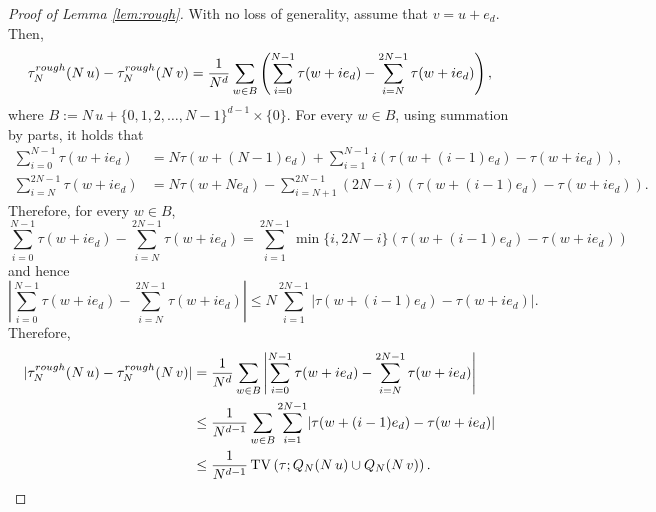 \documentclass[11pt, reqno]{amsart}
\DeclareMathOperator{\TV}{TV}
\numberwithin{equation}{section}
\begin{document}
\begin{proof}[Proof of Lemma \ref{lem:rough}]
With no loss of generality, assume that $v=u+e_d$. 
Then,
$$
\tau^{\rm rough}_N(N\,u)-\tau^{\rm rough}_N(N\,v)=\frac{1}{N^d}\sum_{w\in B}\left(\sum_{i=0}^{N-1}\tau(w+ie_d)-\sum_{i=N}^{2N-1}\tau(w+ie_d)\right),
$$
where $B:=N\,u+\{0,1,2,\ldots,N-1\}^{d-1}\times\{0\}$.
For every $w\in B$, using summation by parts, it holds that
\begin{align*}
\sum_{i=0}^{N-1} \tau(w+ie_d)&=N\tau(w+(N-1)e_d)+\sum_{i=1}^{N-1}i\left(\tau(w+(i-1)e_d)-\tau(w+ie_d)\right),\\
\sum_{i=N}^{2N-1}\tau(w+ie_d)&=N\tau(w+Ne_d)-\sum_{i=N+1}^{2N-1}(2N-i)\left(\tau(w+(i-1)e_d)-\tau(w+ie_d)\right).
\end{align*}
Therefore, for every $w\in B$,
\begin{equation*}
\sum_{i=0}^{N-1} \tau(w+ie_d)-\sum_{i=N}^{2N-1}\tau(w+ie_d)=\sum_{i=1}^{2N-1}\min\{i,2N-i\}\left(\tau(w+(i-1)e_d)-\tau(w+ie_d)\right)
\end{equation*}
and hence
\begin{equation*}
\left\lvert\sum_{i=0}^{N-1} \tau(w+ie_d)-\sum_{i=N}^{2N-1}\tau(w+ie_d)\right\rvert\leq N\sum_{i=1}^{2N-1}\lvert\tau(w+(i-1)e_d)-\tau(w+ie_d)\rvert.
\end{equation*}
Therefore,
\begin{align*}
\lvert\tau^{\rm rough}_N(N\,u)-\tau^{\rm rough}_N(N\,v)\rvert&=\frac{1}{N^d}\sum_{w\in B}\left\lvert\sum_{i=0}^{N-1}\tau(w+ie_d)-\sum_{i=N}^{2N-1}\tau(w+ie_d)\right\rvert\\
&\leq\frac{1}{N^{d-1}}\sum_{w\in B}\sum_{i=1}^{2N-1}\lvert\tau(w+(i-1)e_d)-\tau(w+ie_d)\rvert\\
&\leq\frac{1}{N^{d-1}}\TV\left(\tau; Q_N(N\,u)\cup Q_N(N\,v)\right).
\qedhere
\end{align*}
\end{proof}
\end{document}
